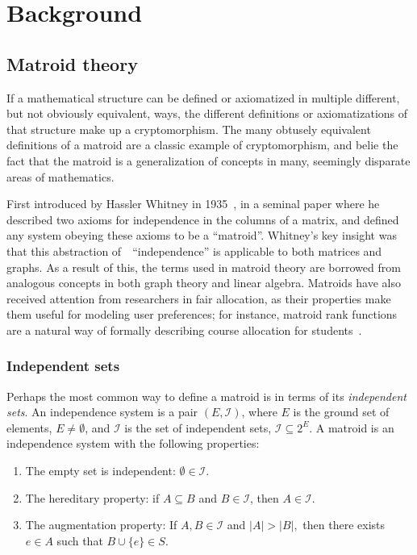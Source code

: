 \chapter{Background}

\section{Matroid theory}
\label{sec:matroid-theory}
If a mathematical structure can be defined or axiomatized in multiple different, but not obviously equivalent, ways, the different definitions or axiomatizations of that structure make up a cryptomorphism. The many obtusely equivalent definitions of a matroid are a classic example of cryptomorphism, and belie the fact that the matroid is a generalization of concepts in many, seemingly disparate areas of mathematics.

First introduced by Hassler Whitney in 1935~\cite{whitney-1935}, in a seminal paper where he described two axioms for independence in the columns of a matrix, and defined any system obeying these axioms to be a ``matroid''. Whitney's key insight was that this abstraction of~~``independence'' is applicable to both matrices and graphs. As a result of this, the terms used in matroid theory are borrowed from analogous concepts in both graph theory and linear algebra. Matroids have also received attention from researchers in fair allocation, as their properties make them useful for modeling user preferences; for instance, matroid rank functions are a natural way of formally describing course allocation for students~\cite{benabbou-2021}. 

\subsection*{Independent sets}
Perhaps the most common way to define a matroid is in terms of its \textit{independent sets}. An independence system is a pair $(E, \mathcal{I})$, where $E$ is the ground set of elements, $E \not= \emptyset$, and $\mathcal{I}$ is the set of independent sets, $\mathcal{I} \subseteq 2^E$. A matroid is an independence system with the following properties:

\begin{enumerate}
  \item The empty set is independent: $\emptyset \in \mathcal{I}$.
  \item The hereditary property: if $A \subseteq B$ and $B \in \mathcal{I}$, then $A \in \mathcal{I}$.
  \item The augmentation property: If $A, B \in \mathcal{I}$ and $|A| > |B|,$ then there exists $e \in A$ such that $B \cup \{e\} \in S$.
\end{enumerate}

